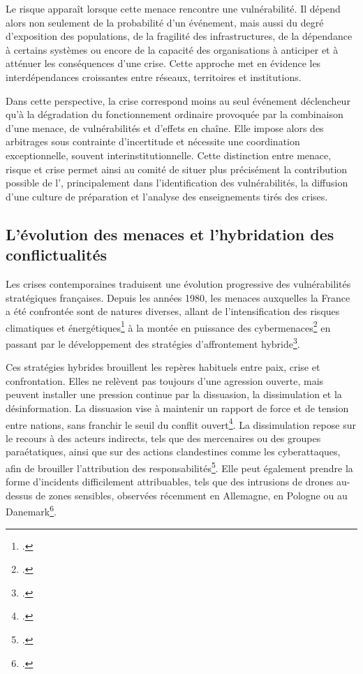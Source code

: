 Le risque apparaît lorsque cette menace rencontre une vulnérabilité. Il dépend alors non seulement de la probabilité d'un événement, mais aussi du degré d'exposition des populations, de la fragilité des infrastructures, de la dépendance à certains systèmes ou encore de la capacité des organisations à anticiper et à atténuer les conséquences d'une crise. Cette approche met en évidence les interdépendances croissantes entre réseaux, territoires et institutions.

Dans cette perspective, la crise correspond moins au seul événement déclencheur qu'à la dégradation du fonctionnement ordinaire provoquée par la combinaison d'une menace, de vulnérabilités et d'effets en chaîne. Elle impose alors des arbitrages sous contrainte d'incertitude et nécessite une coordination exceptionnelle, souvent interinstitutionnelle. Cette distinction entre menace, risque et crise permet ainsi au comité de situer plus précisément la contribution possible de l'\ARSeize, principalement dans l'identification des vulnérabilités, la diffusion d'une culture de préparation et l'analyse des enseignements tirés des crises.

\subsection{L'évolution des menaces et l'hybridation des conflictualités}

Les crises contemporaines traduisent une évolution progressive des vulnérabilités stratégiques françaises.
Depuis les années 1980, les menaces auxquelles la France a été confrontée sont de natures diverses, allant de l'intensification des risques climatiques et énergétiques\footcite{AN:2022:Resilience_nationale} à la montée en puissance des cybermenaces\footcite{Berthier_hacktivisme} en passant par le développement des stratégies d'affrontement hybride\footcite{Gere_affrontement_hybride}.

Ces stratégies hybrides brouillent les repères habituels entre paix, crise et confrontation. Elles ne relèvent pas toujours d'une agression ouverte, mais peuvent installer une pression continue par la dissuasion, la dissimulation et la désinformation. La dissuasion vise à maintenir un rapport de force et de tension entre nations, sans franchir le seuil du conflit ouvert\footcite[p.89]{Gere_affrontement_hybride}. La dissimulation repose sur le recours à des acteurs indirects, tels que des mercenaires ou des groupes paraétatiques, ainsi que sur des actions clandestines comme les cyberattaques, afin de brouiller l'attribution des responsabilités\footcite[p.90]{Gere_affrontement_hybride}. Elle peut également prendre la forme d'incidents difficilement attribuables, tels que des intrusions de drones au-dessus de zones sensibles, observées récemment en Allemagne, en Pologne ou au Danemark\footcite{figaro_drones_europe}.

